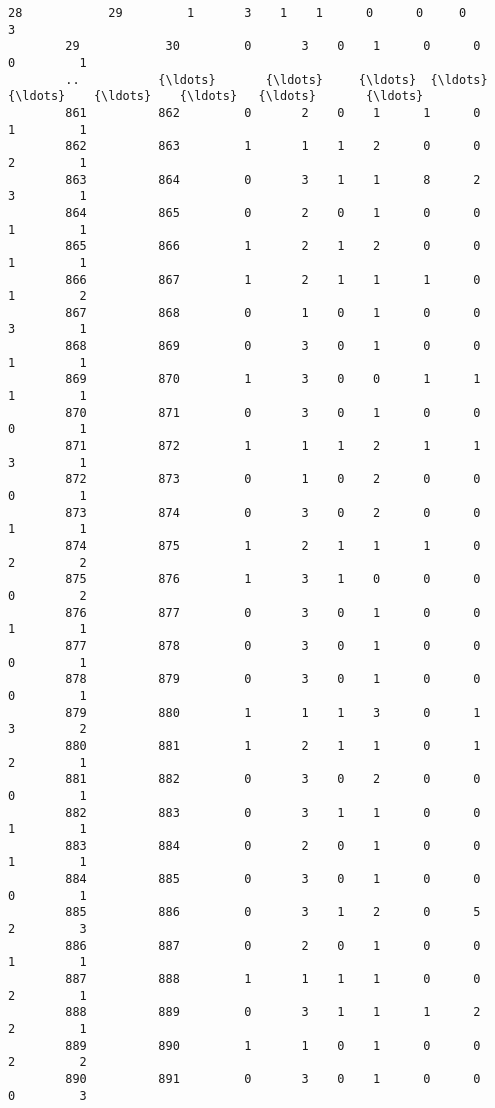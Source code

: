 \documentclass[11pt]{article}
\begin{document}
\begin{Verbatim}[commandchars=\\\{\}]
        28            29         1       3    1    1      0      0     0         3   
        29            30         0       3    0    1      0      0     0         1   
        ..           {\ldots}       {\ldots}     {\ldots}  {\ldots}  {\ldots}    {\ldots}    {\ldots}   {\ldots}       {\ldots}   
        861          862         0       2    0    1      1      0     1         1   
        862          863         1       1    1    2      0      0     2         1   
        863          864         0       3    1    1      8      2     3         1   
        864          865         0       2    0    1      0      0     1         1   
        865          866         1       2    1    2      0      0     1         1   
        866          867         1       2    1    1      1      0     1         2   
        867          868         0       1    0    1      0      0     3         1   
        868          869         0       3    0    1      0      0     1         1   
        869          870         1       3    0    0      1      1     1         1   
        870          871         0       3    0    1      0      0     0         1   
        871          872         1       1    1    2      1      1     3         1   
        872          873         0       1    0    2      0      0     0         1   
        873          874         0       3    0    2      0      0     1         1   
        874          875         1       2    1    1      1      0     2         2   
        875          876         1       3    1    0      0      0     0         2   
        876          877         0       3    0    1      0      0     1         1   
        877          878         0       3    0    1      0      0     0         1   
        878          879         0       3    0    1      0      0     0         1   
        879          880         1       1    1    3      0      1     3         2   
        880          881         1       2    1    1      0      1     2         1   
        881          882         0       3    0    2      0      0     0         1   
        882          883         0       3    1    1      0      0     1         1   
        883          884         0       2    0    1      0      0     1         1   
        884          885         0       3    0    1      0      0     0         1   
        885          886         0       3    1    2      0      5     2         3   
        886          887         0       2    0    1      0      0     1         1   
        887          888         1       1    1    1      0      0     2         1   
        888          889         0       3    1    1      1      2     2         1   
        889          890         1       1    0    1      0      0     2         2   
        890          891         0       3    0    1      0      0     0         3   
        

\end{Verbatim}
\end{document}
